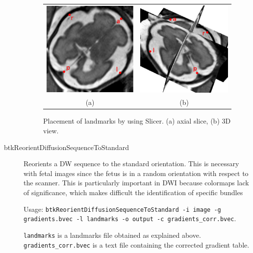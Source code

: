 \begin{description}
\begin{figure}[t]
\centering
\begin{tabular}{cc}
\includegraphics[width=0.35\columnwidth]{lmks_axial.eps}&
\includegraphics[width=0.35\columnwidth]{lmks_3D.eps}\\
{(a)}&{(b)}\\
\end{tabular}
\caption{Placement of landmarks by using Slicer. (a) axial slice, (b) 3D view.}
\label{fig:landmarks}
\end{figure}

  \item[btkReorientDiffusionSequenceToStandard] Reorients a DW sequence
to the standard orientation. This is necessary with fetal images since the fetus
is in a random orientation with respect to the scanner. This is particularly
important in DWI because colormaps lack of significance, which makes difficult
the identification of specific bundles 

Usage: \texttt{btkReorientDiffusionSequenceToStandard -i image -g
gradients.bvec -l landmarks -o output -c gradients\_corr.bvec}.

\texttt{landmarks} is a landmarks file obtained as explained above.
\texttt{gradients\_corr.bvec} is a text file containing the corrected
gradient table.
\end{description}
